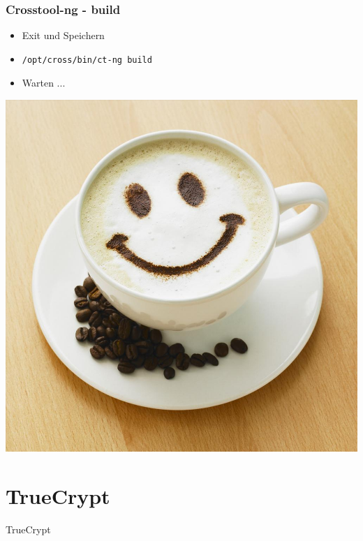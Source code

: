 \documentclass{beamer}
\begin{document}
\begin{frame}[fragile]
\frametitle{Crosstool-ng - build}
\begin{itemize}
\item Exit und Speichern
\item \begin{verbatim}
/opt/cross/bin/ct-ng build
\end{verbatim}
\item Warten ...
\end{itemize}
\begin{center}
\includegraphics[scale=.15]{image/Kaffeetasse.jpg} 
\end{center}
\end{frame}

\section{TrueCrypt}

\begin{frame}
\begin{center}
\begin{Huge}
TrueCrypt
\end{Huge}
\end{center}
\end{frame}
\end{document}
